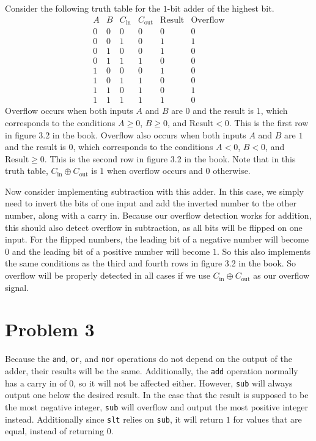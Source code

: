 \documentclass[12pt]{article}
\begin{document}
Consider the following truth table for the \(1\)-bit adder of the highest bit.
\[\begin{array}{c|c|c|c|c|c}
        A & B & C_\text{in} & C_\text{out} & \text{Result} & \text{Overflow}\\
        \hline
        0 & 0 & 0 & 0 & 0 & 0\\
        0 & 0 & 1 & 0 & 1 & 1\\
        0 & 1 & 0 & 0 & 1 & 0\\
        0 & 1 & 1 & 1 & 0 & 0\\
        1 & 0 & 0 & 0 & 1 & 0\\
        1 & 0 & 1 & 1 & 0 & 0\\
        1 & 1 & 0 & 1 & 0 & 1\\
        1 & 1 & 1 & 1 & 1 & 0
\end{array}\]
Overflow occurs when both inputs \(A\) and \(B\) are \(0\) and the result is \(1\), which corresponds to
the conditions \(A\geq 0\), \(B\geq 0\), and \(\text{Result}<0\). This is the first row in figure 3.2 in the book.
Overflow also occurs when both inputs \(A\) and \(B\) are \(1\) and the result is \(0\), which corresponds to
the conditions \(A<0\), \(B<0\), and \(\text{Result}\geq 0\). This is the second row in figure 3.2 in the book.
Note that in this truth table, \(C_\text{in}\oplus C_\text{out}\) is \(1\) when overflow occurs and \(0\) otherwise.

Now consider implementing subtraction with this adder. In this case, we simply need to invert the bits of one input and add the
inverted number to the other number, along with a carry in. Because our overflow detection works for addition, this should
also detect overflow in subtraction, as all bits will be flipped on one input. For the flipped numbers, the leading bit of a negative
number will become \(0\) and the leading bit of a positive number will become \(1\). So this also implements the same conditions as the
third and fourth rows in figure 3.2 in the book. So overflow will be properly detected in all cases if we use \(C_\text{in}\oplus C_\text{out}\)
as our overflow signal.

\section*{Problem 3}

Because the \texttt{and}, \texttt{or}, and \texttt{nor} operations do not depend on the output of the adder, their results will be the same.
Additionally, the \texttt{add} operation normally has a carry in of \(0\), so it will not be affected either. However, \texttt{sub}
will always output one below the desired result. In the case that the result is supposed to be the most negative integer, \texttt{sub}
will overflow and output the most positive integer instead. Additionally since \texttt{slt} relies on \texttt{sub}, it will return \(1\) for
values that are equal, instead of returning \(0\).
\end{document}
